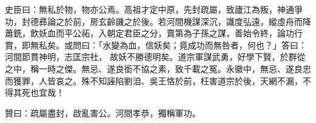 \begin{pinyinscope}
 史臣曰：無私於物，物亦公焉。高祖才定中原，先封疏屬，致廬江為叛，神通爭功，封德彞論之於前，房玄齡譏之於後。若河間機謀深沉，識度弘遠，縱虛舟而降蕭銑，飲妖血而平公祏，入朝定君臣之分，賣第為子孫之謀，善始令終，論功行賞，即無私矣。或問曰：「水變為血，信妖矣；竟成功而無咎者，何也？」答曰：河間節貫神明，志匡宗社，
 故妖不勝德明矣。道宗軍謀武勇，好學下賢，於群從之中，稱一時之傑。無忌、遂良銜不協之素，致千載之冤。永徽中，無忌、遂良忠而獲罪，人皆哀之。殊不知誣陷劉洎、吳王恪於前，枉害道宗於後，天網不漏，不得其死也宜哉！



 贊曰：疏屬盡封，啟亂害公。河間孝恭，獨稱軍功。



\end{pinyinscope}